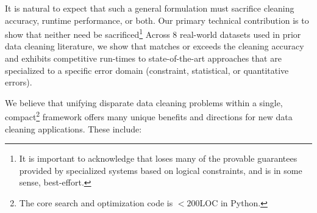 It is natural to expect that such a general formulation must sacrifice cleaning accuracy, runtime performance, or both.  Our primary technical contribution is to show that neither need be sacrificed\footnote{It is important to acknowledge that \sys loses many of the provable guarantees provided by specialized systems based on logical constraints, and is in some sense, best-effort.  }
Across 8 real-world datasets used in prior data cleaning literature, we show that \sys matches or exceeds the cleaning accuracy and exhibits competitive run-times to state-of-the-art approaches that are specialized to a specific error domain (constraint, statistical, or quantitative errors).  

We believe that unifying disparate data cleaning problems within a single, compact\footnote{The core search and optimization code is $<200$LOC in Python.} framework offers many unique benefits and directions for new data cleaning applications.  These include:
